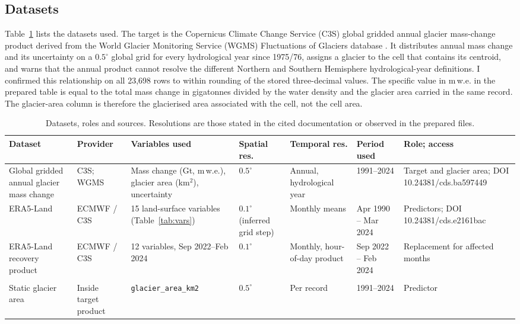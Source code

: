 \documentclass[conference]{IEEEtran}
\newcommand{\mwe}{m\,w.e.}
\begin{document}
\subsection{Datasets}
Table~\ref{tab:datasets} lists the datasets used. The target is the Copernicus Climate Change Service (C3S) global gridded annual glacier mass-change product derived from the World Glacier Monitoring Service (WGMS) Fluctuations of Glaciers database \cite{wgmsgrid,dussaillant2024}. It distributes annual mass change and its uncertainty on a $0.5^\circ$ global grid for every hydrological year since 1975/76, assigns a glacier to the cell that contains its centroid, and warns that the annual product cannot resolve the different Northern and Southern Hemisphere hydrological-year definitions. I confirmed this relationship on all 23,698 rows to within rounding of the stored three-decimal values. The specific value in \mwe{} in the prepared table is equal to the total mass change in gigatonnes divided by the water density and the glacier area carried in the same record. The glacier-area column is therefore the glacierised area associated with the cell, not the cell area.

\begin{table}[t]
\caption{Datasets, roles and sources. Resolutions are those stated in the cited documentation or observed in the prepared files.}
\label{tab:datasets}
\centering
\footnotesize
\setlength{\tabcolsep}{3pt}
\begin{tabular}{p{}p{}p{}p{}p{}p{}p{}}
\toprule
Dataset & Provider & Variables used & Spatial res. & Temporal res. & Period used & Role; access\\
\midrule
Global gridded annual glacier mass change & C3S; WGMS & Mass change (Gt, \mwe), glacier area (km$^2$), uncertainty & $0.5^\circ$ & Annual, hydrological year & 1991--2024 & Target and glacier area; DOI 10.24381/cds.ba597449 \cite{wgmsgrid}\\
ERA5-Land & ECMWF / C3S & 15 land-surface variables (Table~\ref{tab:vars}) & $0.1^\circ$(inferred grid step) & Monthly means & Apr 1990 -- Mar 2024 & Predictors; DOI 10.24381/cds.e2161bac \cite{era5land,era5landpaper}\\
ERA5-Land recovery product & ECMWF / C3S & 12 variables, Sep 2022--Feb 2024 & $0.1^\circ$ & Monthly, hour-of-day product & Sep 2022 -- Feb 2024 & Replacement for affected months \cite{ecmwfissue}\\\\
Static glacier area & Inside target product & \texttt{glacier\_area\_km2} & $0.5^\circ$ & Per record & 1991--2024 & Predictor \cite{wgmsgrid}\\
\bottomrule
\end{tabular}
\end{table}
\end{document}
